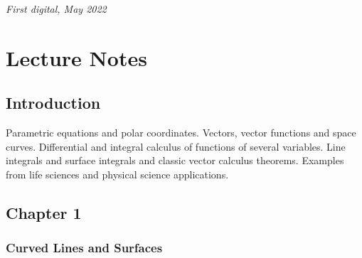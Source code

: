 \documentclass[11pt,fleqn]{book} %
\begin{document}
\noindent \textit{First digital, May 2022} %




\pagestyle{empty} %

\tableofcontents %

\cleardoublepage %

\pagestyle{fancy} %



\part{Lecture Notes}


\chapter*{Introduction}

Parametric equations and polar coordinates. Vectors, vector functions and space curves. Differential and integral calculus of functions of several variables. Line integrals and surface integrals and classic vector calculus theorems. Examples from life sciences and physical science applications.

\chapter{Chapter 1}

\section{Curved Lines and Surfaces}
\end{document}
